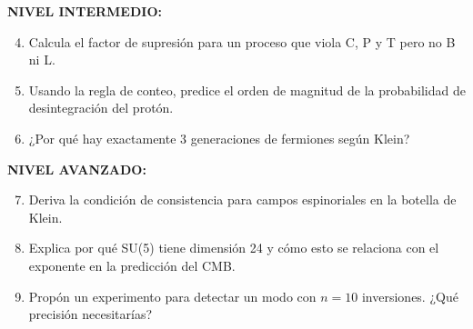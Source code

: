 \textbf{NIVEL INTERMEDIO:}
\begin{enumerate}
\setcounter{enumi}{3}
    \item Calcula el factor de supresión para un proceso que viola C, P y T
    pero no B ni L.

    \item Usando la regla de conteo, predice el orden de magnitud de la
    probabilidad de desintegración del protón.

    \item ¿Por qué hay exactamente 3 generaciones de fermiones según Klein?
\end{enumerate}

\textbf{NIVEL AVANZADO:}
\begin{enumerate}
\setcounter{enumi}{6}
    \item Deriva la condición de consistencia para campos espinoriales
    en la botella de Klein.

    \item Explica por qué SU(5) tiene dimensión 24 y cómo esto se relaciona
    con el exponente en la predicción del CMB.

    \item Propón un experimento para detectar un modo con $n=10$ inversiones.
    ¿Qué precisión necesitarías?
\end{enumerate}
